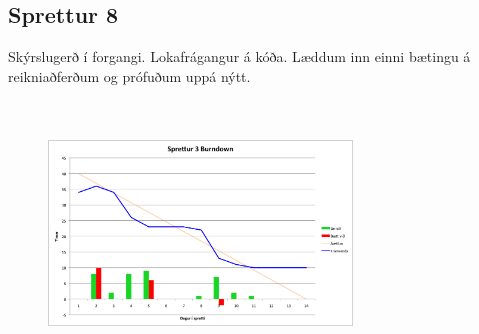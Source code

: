 \documentclass{article}
\begin{document}
\subsection{Sprettur 8}
Skýrslugerð í forgangi. Lokafrágangur á kóða. Læddum inn einni
bætingu á reikniaðferðum og prófuðum uppá nýtt.
\hfil \\
\hfil \\
\hfil \\
\begin{figure}[H]
 \centering
 \includegraphics[width=0.72\textwidth]{Sprettur3_Burndown.png}
 \caption{}
\label{fig:sp8}
\end{figure}

\hfil \\
\hfil \\
\hfil \\
\hfil \\

\end{document}
